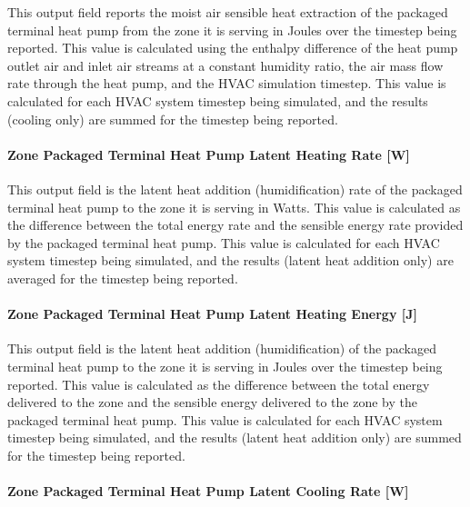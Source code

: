 This output field reports the moist air sensible heat extraction of the packaged terminal heat pump from the zone it is serving in Joules over the timestep being reported. This value is calculated using the enthalpy difference of the heat pump outlet air and inlet air streams at a constant humidity ratio, the air mass flow rate through the heat pump, and the HVAC simulation timestep. This value is calculated for each HVAC system timestep being simulated, and the results (cooling only) are summed for the timestep being reported.

\paragraph{Zone Packaged Terminal Heat Pump Latent Heating Rate {[}W{]}}\label{zone-packaged-terminal-heat-pump-latent-heating-rate-w}

This output field is the latent heat addition (humidification) rate of the packaged terminal heat pump to the zone it is serving in Watts. This value is calculated as the difference between the total energy rate and the sensible energy rate provided by the packaged terminal heat pump. This value is calculated for each HVAC system timestep being simulated, and the results (latent heat addition only) are averaged for the timestep being reported.

\paragraph{Zone Packaged Terminal Heat Pump Latent Heating Energy {[}J{]}}\label{zone-packaged-terminal-heat-pump-latent-heating-energy-j}

This output field is the latent heat addition (humidification) of the packaged terminal heat pump to the zone it is serving in Joules over the timestep being reported. This value is calculated as the difference between the total energy delivered to the zone and the sensible energy delivered to the zone by the packaged terminal heat pump. This value is calculated for each HVAC system timestep being simulated, and the results (latent heat addition only) are summed for the timestep being reported.

\paragraph{Zone Packaged Terminal Heat Pump Latent Cooling Rate {[}W{]}}\label{zone-packaged-terminal-heat-pump-latent-cooling-rate-w}

